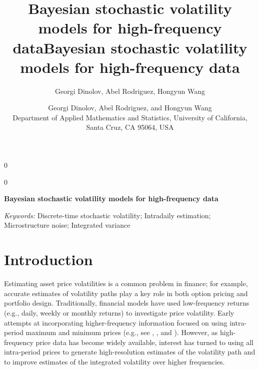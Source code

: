 \documentclass[10pt]{article}
\title{Bayesian stochastic volatility models for high-frequency data}
\author{Georgi Dinolov, Abel Rodriguez, Hongyun Wang}
\date{} %
\newcommand{\blind}{0}
\begin{document}
\def\spacingset#1{\renewcommand{\baselinestretch}%
{#1}\small\normalsize} \spacingset{1}

\blind
{
  \title{\bf Bayesian stochastic volatility models for high-frequency data}
  \author{Georgi Dinolov, Abel Rodriguez, and Hongyun Wang\\
    {\small Department of Applied Mathematics and Statistics, University of California, Santa Cruz, CA 95064, USA}}
  \maketitle
} \fi

\blind
{
  \bigskip
  \bigskip
  \bigskip
  \begin{center}
    {\LARGE\bf Bayesian stochastic volatility models for high-frequency data}
\end{center}
  \medskip
} \fi

\bigskip


\vspace{1cm}
\noindent
{\it Keywords:} Discrete-time stochastic volatility; Intradaily estimation; Microstructure noise; Integrated variance

\spacingset{1.00} %
\section{Introduction}\label{se:introduction}

Estimating asset price volatilities is a common problem in finance; for example, accurate estimates of volatility paths play a key role in both option pricing and portfolio design.  Traditionally, financial models have used low-frequency returns (e.g., daily, weekly or monthly returns) to investigate price volatility.  Early attempts at incorporating higher-frequency information focused on using intra-period maximum and minimum prices (e.g., see \citealp{alizadeh2002range}, \citealp{brandt2003no-arb}, and \citealp{chou2010range}).  However, as high-frequency price data has become widely available, interest has turned to using all intra-period prices to generate high-resolution estimates of the volatility path and to improve estimates of the integrated volatility over higher frequencies.
\end{document}

